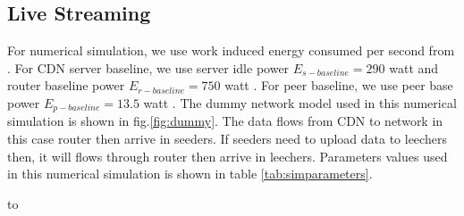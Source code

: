 \documentclass[JIP]{ipsj}
\begin{document}
\subsection{Live Streaming}
For numerical simulation, we use work induced energy consumed per second from \cite{Nedevschi:2008:HDC:1855610.1855618}.
For CDN server baseline, we use server idle power $E_{s-baseline}=290$ watt and router baseline power $E_{r-baseline}=750$ watt \cite{Nedevschi:2008:HDC:1855610.1855618}. 
For peer baseline, we use peer base power $E_{p-baseline}=13.5$ watt \cite{valancius2009greening}.
The dummy network model used in this numerical simulation is shown in fig.\ref{fig:dummy}.
The data flows from CDN to network in this case router then arrive in seeders. 
If seeders need to upload data to leechers then, it will flows through router then arrive in leechers. 
Parameters values used in this numerical simulation is shown in table \ref{tab:simparameters}.
\begin{table}[thb]
\caption{Numerical Simulation Parameters.}
\label{tab:simparameters}
\hbox to
\end{table}
\end{document}
